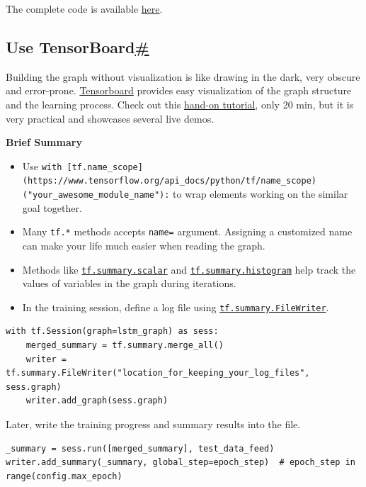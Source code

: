 The complete code is available \href{https://github.com/lilianweng/stock-rnn/blob/master/build_graph.py}{here}.

\subsection{\texorpdfstring{Use TensorBoard\hyperref[use-tensorboard]{\#}}{Use TensorBoard\#}}\label{use-tensorboard}

Building the graph without visualization is like drawing in the dark, very obscure and error-prone. \href{https://github.com/tensorflow/tensorboard}{Tensorboard} provides easy visualization of the graph structure and the learning process. Check out this \href{https://youtu.be/eBbEDRsCmv4}{hand-on tutorial}, only 20 min, but it is very practical and showcases several live demos.

\textbf{Brief Summary}

\begin{itemize}
\tightlist
\item
  Use \texttt{with\ {[}tf.name\_scope{]}(https://www.tensorflow.org/api\_docs/python/tf/name\_scope)("your\_awesome\_module\_name"):} to wrap elements working on the similar goal together.
\item
  Many \texttt{tf.*} methods accepts \texttt{name=} argument. Assigning a customized name can make your life much easier when reading the graph.
\item
  Methods like \href{https://www.tensorflow.org/api_docs/python/tf/summary/scalar}{\texttt{tf.summary.scalar}} and \href{https://www.tensorflow.org/api_docs/python/tf/summary/histogram}{\texttt{tf.summary.histogram}} help track the values of variables in the graph during iterations.
\item
  In the training session, define a log file using \href{https://www.tensorflow.org/api_docs/python/tf/summary/FileWriter}{\texttt{tf.summary.FileWriter}}.
\end{itemize}

\begin{verbatim}
with tf.Session(graph=lstm_graph) as sess:
    merged_summary = tf.summary.merge_all()
    writer = tf.summary.FileWriter("location_for_keeping_your_log_files", sess.graph)
    writer.add_graph(sess.graph)
\end{verbatim}

Later, write the training progress and summary results into the file.

\begin{verbatim}
_summary = sess.run([merged_summary], test_data_feed)
writer.add_summary(_summary, global_step=epoch_step)  # epoch_step in range(config.max_epoch)
\end{verbatim}

